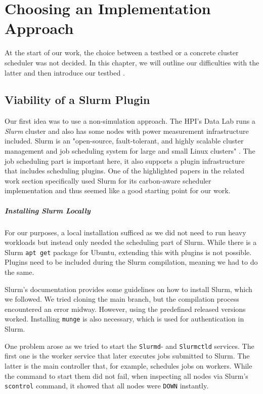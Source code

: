 \chapter{Choosing an Implementation Approach}

At the start of our work, the choice between a testbed or a concrete cluster scheduler was not decided. 
In this chapter, we will outline our difficulties with the latter and then introduce our testbed \programname{}.

\section{Viability of a Slurm Plugin}
\label{subsec:slurm_plugin}

Our first idea was to use a non-simulation approach. 
The HPI's Data Lab  runs a \emph{Slurm} cluster and also has some nodes with power measurement infrastructure included. 
Slurm is an "open-source, fault-tolerant, and highly scalable cluster management and job scheduling system for large and small Linux clusters" .
The job scheduling part is important here, it also supports a plugin infrastructure that includes scheduling plugins. 
One of the highlighted papers \cite{inigo_goiri_greenslot_2011} in the related work section specifically used Slurm for its carbon-aware scheduler implementation and thus seemed like a good starting point for our work.

\paragraph{Installing Slurm Locally}

For our purposes, a local installation sufficed as we did not need to run heavy workloads but instead only needed the scheduling part of Slurm. 
While there is a Slurm \verb|apt get| package for Ubuntu, extending this with plugins is not possible. 
Plugins need to be included during the Slurm compilation, meaning we had to do the same.

Slurm's documentation provides some guidelines on how to install Slurm, which we followed. 
We tried cloning the main branch, but the compilation process encountered an error midway. However, using the predefined released versions worked.
Installing \verb|munge|  is also necessary, which is used for authentication in Slurm.

One problem arose as we tried to start the \verb|Slurmd|- and \verb|Slurmctld| services. The first one is the worker service that later executes jobs submitted to Slurm. The latter is the main controller that, for example, schedules jobs on workers. While the command to start them did not fail, when inspecting all nodes via Slurm's \verb|scontrol| command, it showed that all nodes were \verb|DOWN| instantly.

